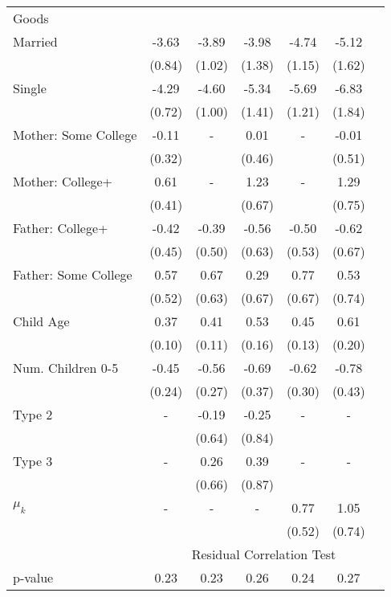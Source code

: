 \begin{tabular}{lcccccc}
Goods}\\\cmidrule(r){2-7}Married&-3.63&-3.89&-3.98&-4.74&-5.12&\\&(0.84)&(1.02)&(1.38)&(1.15)&(1.62)&\\Single&-4.29&-4.60&-5.34&-5.69&-6.83&\\&(0.72)&(1.00)&(1.41)&(1.21)&(1.84)&\\Mother: Some College&-0.11&-&0.01&-&-0.01&\\&(0.32)&&(0.46)&&(0.51)&\\Mother: College+&0.61&-&1.23&-&1.29&\\&(0.41)&&(0.67)&&(0.75)&\\Father: College+&-0.42&-0.39&-0.56&-0.50&-0.62&\\&(0.45)&(0.50)&(0.63)&(0.53)&(0.67)&\\Father: Some College&0.57&0.67&0.29&0.77&0.53&\\&(0.52)&(0.63)&(0.67)&(0.67)&(0.74)&\\Child Age&0.37&0.41&0.53&0.45&0.61&\\&(0.10)&(0.11)&(0.16)&(0.13)&(0.20)&\\Num. Children 0-5&-0.45&-0.56&-0.69&-0.62&-0.78&\\&(0.24)&(0.27)&(0.37)&(0.30)&(0.43)&\\Type 2&-&-0.19&-0.25&-&-&\\&&(0.64)&(0.84)&&&\\Type 3&-&0.26&0.39&-&-&\\&&(0.66)&(0.87)&&&\\$\mu_{k}$&-&-&-&0.77&1.05&\\&&&&(0.52)&(0.74)&\\& \multicolumn{6}{c}{Residual Correlation Test}\\\cmidrule(r){2-7}p-value&0.23&0.23&0.26&0.24&0.27&\\
\bottomrule\end{tabular}